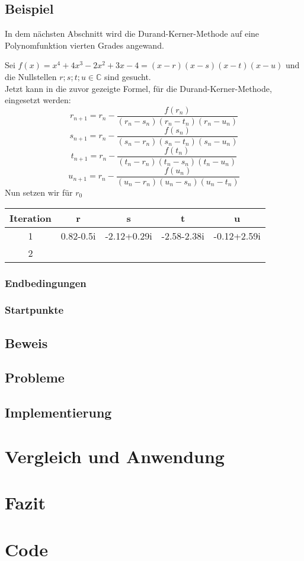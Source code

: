 \documentclass[12pt]{article}
\begin{document}
    \subsection{Beispiel}
        In dem nächsten Abschnitt wird die Durand-Kerner-Methode auf eine Polynomfunktion vierten Grades angewand. \par
        Sei $f(x) = x^4 + 4x^3 - 2x^2 + 3x - 4 = (x-r)(x-s)(x-t)(x-u)$ und die Nullstellen $r;s;t;u \in \mathbb{C}$ sind gesucht. \\
        Jetzt kann in die zuvor gezeigte Formel, für die Durand-Kerner-Methode, eingesetzt werden:
        \begin{displaymath}
            r_{n+1} = r_n-\frac{f(r_n)}{(r_n-s_n)(r_n-t_n)(r_n-u_n)}
        \end{displaymath}
        \begin{displaymath}
            s_{n+1} = r_n-\frac{f(s_n)}{(s_n-r_n)(s_n-t_n)(s_n-u_n)}
        \end{displaymath}
        \begin{displaymath}
            t_{n+1} = r_n-\frac{f(t_n)}{(t_n-r_n)(t_n-s_n)(t_n-u_n)}
        \end{displaymath}
        \begin{displaymath}
            u_{n+1} = r_n-\frac{f(u_n)}{(u_n-r_n)(u_n-s_n)(u_n-t_n)}
        \end{displaymath}
        \vspace{0.2cm}
        Nun setzen wir für $r_0$ %
        \begin{center}
        \begin{tabular}{c|c c c c}
            Iteration & r & s & t & u \\
            \hline
            1 & 0.82-0.5i & -2.12+0.29i & -2.58-2.38i & -0.12+2.59i \\
            2 &
        \end{tabular}
        \end{center}
        
    \subsubsection{Endbedingungen}
    \subsubsection{Startpunkte}
    \subsection{Beweis}
    \subsection{Probleme}
    \subsection{Implementierung}

\section{Vergleich und Anwendung}

\section{Fazit}

\section{Code}
\end{document}
